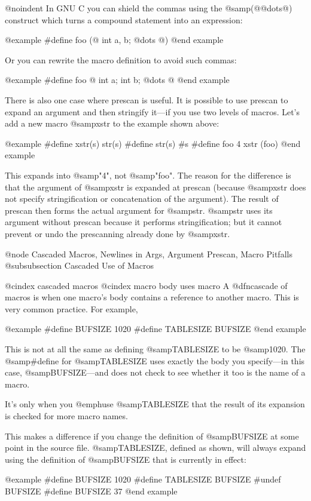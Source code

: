 {{@noindent
In GNU C you can shield the commas using the @samp{(@{@dots{}@})}
construct which turns a compound statement into an expression:

@example
#define foo (@{ int a, b; @dots{} @})
@end example

Or you can rewrite the macro definition to avoid such commas:

@example
#define foo @{ int a; int b; @dots{} @}
@end example

There is also one case where prescan is useful.  It is possible
to use prescan to expand an argument and then stringify it---if you use
two levels of macros.  Let's add a new macro @samp{xstr} to the
example shown above:

@example
#define xstr(s) str(s)
#define str(s) #s
#define foo 4
xstr (foo)
@end example

This expands into @samp{"4"}, not @samp{"foo"}.  The reason for the
difference is that the argument of @samp{xstr} is expanded at prescan
(because @samp{xstr} does not specify stringification or concatenation of
the argument).  The result of prescan then forms the actual argument for
@samp{str}.  @samp{str} uses its argument without prescan because it
performs stringification; but it cannot prevent or undo the prescanning
already done by @samp{xstr}.

@node Cascaded Macros, Newlines in Args, Argument Prescan, Macro Pitfalls
@subsubsection Cascaded Use of Macros

@cindex cascaded macros
@cindex macro body uses macro
A @dfn{cascade} of macros is when one macro's body contains a reference
to another macro.  This is very common practice.  For example,

@example
#define BUFSIZE 1020
#define TABLESIZE BUFSIZE
@end example

This is not at all the same as defining @samp{TABLESIZE} to be @samp{1020}.
The @samp{#define} for @samp{TABLESIZE} uses exactly the body you
specify---in this case, @samp{BUFSIZE}---and does not check to see whether
it too is the name of a macro.

It's only when you @emph{use} @samp{TABLESIZE} that the result of its expansion
is checked for more macro names.

This makes a difference if you change the definition of @samp{BUFSIZE}
at some point in the source file.  @samp{TABLESIZE}, defined as shown,
will always expand using the definition of @samp{BUFSIZE} that is
currently in effect:

@example
#define BUFSIZE 1020
#define TABLESIZE BUFSIZE
#undef BUFSIZE
#define BUFSIZE 37
@end example

}}
